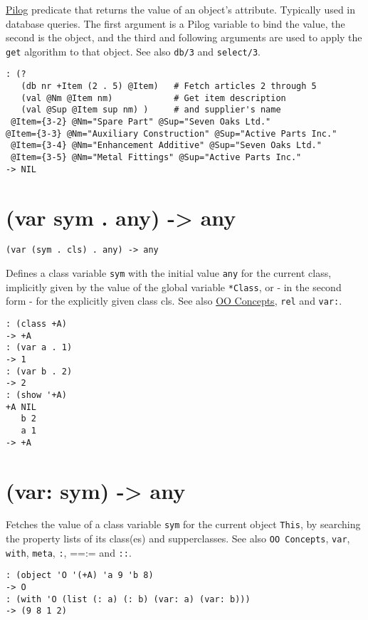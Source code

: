 {{{{{{{{\hyperref[ref.html-pilog]{Pilog} predicate that returns the value of an
object's attribute. Typically used in database queries. The first
argument is a Pilog variable to bind the value, the second is the
object, and the third and following arguments are used to apply the
\texttt{get} algorithm to that object. See also \texttt{db/3} and \texttt{select/3}.


\begin{verbatim}
: (?
   (db nr +Item (2 . 5) @Item)   # Fetch articles 2 through 5
   (val @Nm @Item nm)            # Get item description
   (val @Sup @Item sup nm) )     # and supplier's name
 @Item={3-2} @Nm="Spare Part" @Sup="Seven Oaks Ltd."                             @Item={3-3} @Nm="Auxiliary Construction" @Sup="Active Parts Inc."
 @Item={3-4} @Nm="Enhancement Additive" @Sup="Seven Oaks Ltd."
 @Item={3-5} @Nm="Metal Fittings" @Sup="Active Parts Inc."
-> NIL
\end{verbatim}

 
\section{(var sym . any) -> any}
\label{sec-8-1-22-3}


\texttt{(var (sym . cls) . any) -> any}

Defines a class variable \texttt{sym} with the initial value \texttt{any} for the
current class, implicitly given by the value of the global variable
\texttt{*Class}, or - in the second form - for the explicitly given class cls.
See also \hyperref[ref.html-oop]{OO Concepts}, \texttt{rel} and \texttt{var:}.


\begin{verbatim}
: (class +A)
-> +A
: (var a . 1)
-> 1
: (var b . 2)
-> 2
: (show '+A)
+A NIL
   b 2
   a 1
-> +A
\end{verbatim}

 
\section{(var: sym) -> any}
\label{sec-8-1-22-4}


Fetches the value of a class variable \texttt{sym} for the current object
\texttt{This}, by searching the property lists of its class(es) and
supperclasses. See also \texttt{OO Concepts}, \texttt{var}, \texttt{with}, \texttt{meta}, \texttt{:}, ==:=
and \texttt{::}.


\begin{verbatim}
: (object 'O '(+A) 'a 9 'b 8)
-> O
: (with 'O (list (: a) (: b) (var: a) (var: b)))
-> (9 8 1 2)
\end{verbatim}

}}}}}}}}
